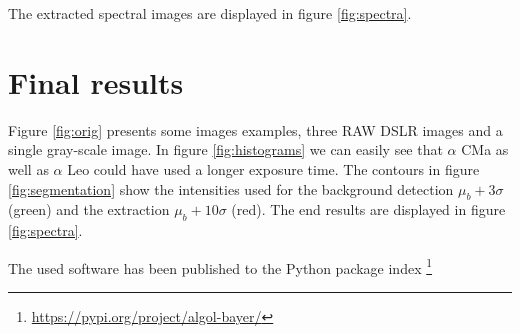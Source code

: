 \documentclass[10pt,a4paper,notitlepage]{article}
\begin{document}
		The extracted spectral images are displayed in figure \ref{fig:spectra}.
		
\section{Final results}

	Figure \ref{fig:orig} presents some images examples, three RAW DSLR images and a single gray-scale image.
	In figure \ref{fig:histograms} we can easily see that $\alpha$ CMa as well as $\alpha$ Leo could have used a longer exposure time.
	The contours in figure \ref{fig:segmentation} show the intensities used for the background detection $\mu_b + 3 \sigma$ (green) and the extraction $\mu_b + 10 \sigma$ (red).
	The end results are displayed in figure \ref{fig:spectra}.
	
	The used software has been published to the Python package index \footnote{\url{https://pypi.org/project/algol-bayer/}}
	
\end{document}
